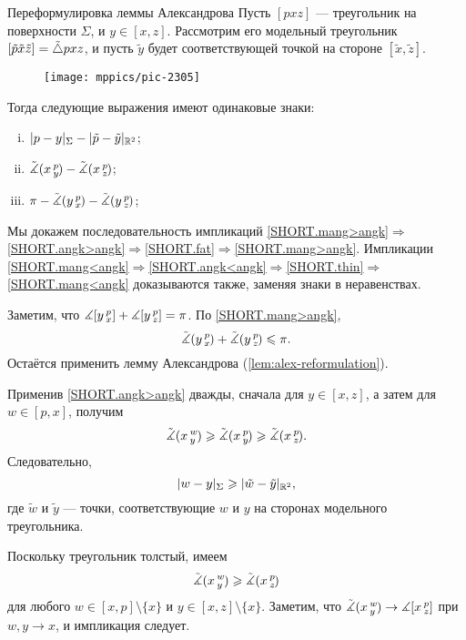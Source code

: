 \begin{thm}{Переформулировка леммы Александрова}\label{lem:alex-reformulation}
Пусть $[pxz]$ --- треугольник на поверхности $\Sigma$, 
и $y\in[x,z]$. 
Рассмотрим его модельный треугольник $[\tilde p\tilde x\tilde z]\z=\tilde\triangle pxz$, и пусть $\tilde y$ будет соответствующей точкой на стороне $[\tilde x,\tilde z]$.

\begin{wrapfigure}{r}{25mm}
\vskip-2mm
\centering
\texttt{[image: mppics/pic-2305]}
\end{wrapfigure}

Тогда следующие выражения имеют одинаковые знаки:
\begin{enumerate}[(i)]
 \item $\dist{p}{y}\Sigma-\dist{\tilde p}{\tilde y}{\mathbb{R}^2}$;
 \item $\tilde\measuredangle(x\,{}^{p}_{y}\hspace{-0.2ex})-\tilde\measuredangle(x\,{}^{p}_{z}\hspace{-0.2ex})$;
 \item $\pi-\tilde\measuredangle(y\,{}^{p}_{x}\hspace{-0.2ex})-\tilde\measuredangle(y\,{}^{p}_{z}\hspace{-0.2ex})$;
\end{enumerate}
\end{thm}

Мы докажем последовательность импликаций \ref{SHORT.mang>angk}$\Rightarrow$\ref{SHORT.angk>angk}$\Rightarrow$\ref{SHORT.fat}$\Rightarrow$\ref{SHORT.mang>angk}.
Импликации \ref{SHORT.mang<angk}$\Rightarrow$\ref{SHORT.angk<angk}$\Rightarrow$\ref{SHORT.thin}$\Rightarrow$\ref{SHORT.mang<angk} доказываются также, заменяя знаки в неравенствах.

Заметим, что $\measuredangle[y\,{}^{p}_{x}]+\measuredangle[y\,{}^{p}_{z}]=\pi$.
По \ref{SHORT.mang>angk}, 
\[\tilde\measuredangle(y\,{}^{p}_{x}\hspace{-0.2ex})+\tilde\measuredangle(y\,{}^{p}_{z}\hspace{-0.2ex})\leqslant \pi.\]
Остаётся применить лемму Александрова (\ref{lem:alex-reformulation}).

Применив \ref{SHORT.angk>angk} дважды, сначала для $y\in [x,z]$, а затем для $w\in [p,x]$, получим
\[\tilde\measuredangle(x\,{}^{w}_{y}\hspace{-0.2ex}) \geqslant \tilde\measuredangle(x\,{}^{p}_{y}\hspace{-0.2ex}) \geqslant \tilde\measuredangle(x\,{}^{p}_{z}\hspace{-0.2ex}).\]
Следовательно,
\[\dist{w}{y}\Sigma\ge \dist{\tilde w}{\tilde y}{\mathbb{R}^2},\]
где $\tilde w$ и $\tilde y$ --- точки, соответствующие $w$ и $y$ на сторонах модельного треугольника. 

Поскольку треугольник толстый, имеем
\[\tilde\measuredangle(x\,{}^{w}_{y}\hspace{-0.2ex}) \geqslant \tilde\measuredangle(x\,{}^{p}_{z}\hspace{-0.2ex})\]
для любого $w\in [x,p]\setminus \{x\}$ и $y\in [x,z]\setminus \{x\}$.
Заметим, что $\modangle xwy\z\to \measuredangle\hinge xpz$ при $w,y\to x$,
и импликация следует.
\qeds

